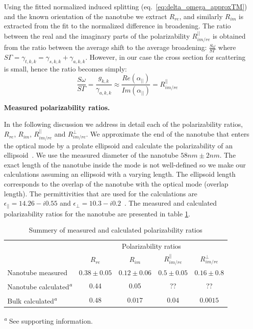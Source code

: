 \documentclass[journal=jacsat,manuscript=article]{achemso}
\begin{document}
Using the fitted normalized induced splitting (eq.~\ref{eq:delta_omega_approxTM}) and the known orientation of the nanotube we extract $R_{re}$, and similarly $R_{im}$ is extracted from the fit to the normalized difference in broadening.
The ratio between the real and the imaginary parts of the polarizability $R_{im/re}^{||}$
is obtained from the ratio between the average shift to the average broadening: $\frac{\textit{S} \omega} {\textit{S} \Gamma}$ where $\textit{S} \Gamma= \gamma_{t,k,k}=\gamma_{s,k,k}+\gamma_{a,k,k}$. However, in our case  the cross section for scattering is small, hence the ratio becomes simply:
\begin{equation}\label{eq:Rre_im_noscatt}
   \frac{\textit{S} \omega} {\textit{S} \Gamma}=\frac{g_{k,k}}{\gamma_{a,k,k}}\approx \frac{Re ( \alpha_{||} )}{Im (\alpha_{||})} = R_{im/re}^{||}
\end{equation}

\textbf{Measured polarizability ratios.}

In the following discussion we address in detail each of the polarizability ratios, $R_{re}$, $R_{im}$, $R_{im/re}^{||}$ and $R_{im/re}^{\perp}$. We approximate the end of the nanotube that enters the optical mode by a prolate ellipsoid and calculate the polarizability of an ellipsoid~\cite{hulst1957light}. We use the measured diameter of the nanotube $58nm \pm 2nm$. The exact length of the nanotube inside the mode is not well-defined so we make our calculations assuming an ellipsoid with a varying length. The ellipsoid length corresponds to the overlap of the nanotube with the optical mode (overlap length).  The permittivities that are used for the calculations are $\epsilon_{||}=14.26-i0.55$ and $\epsilon_{\perp}=10.3-i0.2$~\cite{taverna2002}. The measured and calculated polarizability ratios for the nanotube are presented in table \ref{tbl:PR}.

\begin{table}[H]
  \caption{Summery of measured and calculated polarizability ratios}
  \label{tbl:PR}
  \begin{tabular}{lcccc}
    \hline
     & \multicolumn{4}{c}{Polarizability ratios}\\
                                & $R_{re}$ & $R_{im}$ & $R_{im/re}^{||}$ & $R_{im/re}^{\perp}$ \\
    \hline
    Nanotube measured  & $0.38 \pm 0.05$ &  $0.12 \pm 0.06$ & $0.5 \pm 0.05$ & $0.16 \pm 0.8$ \\
    Nanotube calculated\textsuperscript{\emph{a}}  & 0.44 &  0.05 & ?? & ?? \\
    Bulk calculated\textsuperscript{\emph{a}}  & $0.48$ &  $0.017$ & $0.04$ & $0.0015$ \\
    \hline
  \end{tabular}
  
  \textsuperscript{\emph{a}} See supporting information.
\end{table}
\end{document}
